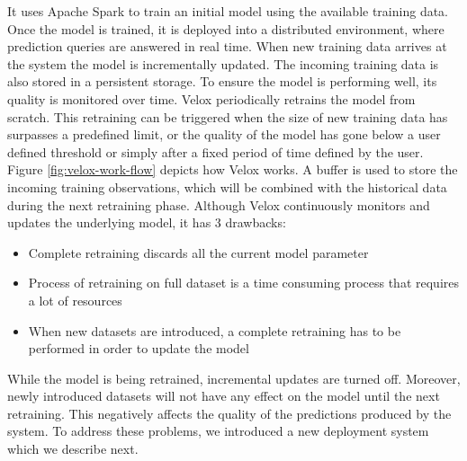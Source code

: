 \documentclass{vldb}
\begin{document}
It uses Apache Spark to train an initial model using the available training data.
Once the model is trained, it is deployed into a distributed environment, where prediction queries are answered in real time.
When new training data arrives at the system the model is incrementally updated.
The incoming training data is also stored in a persistent storage.
To ensure the model is performing well, its quality is monitored over time.
Velox periodically retrains the model from scratch. 
This retraining can be triggered when the size of new training data has surpasses a predefined limit, or the quality of the model has gone below a user defined threshold or simply after a fixed period of time defined by the user.
Figure \ref{fig:velox-work-flow} depicts how Velox works. 
A buffer is used to store the incoming training observations, which will be combined with the historical data during the next retraining phase.
Although Velox continuously monitors and updates the underlying model, it has 3 drawbacks:\\
\begin{itemize}
\item Complete retraining discards all the current model parameter
\item Process of retraining on full dataset is a time consuming process that requires a lot of resources
\item When new datasets are introduced, a complete retraining has to be performed in order to update the model
\end{itemize}
While the model is being retrained, incremental updates are turned off.
Moreover, newly introduced datasets will not have any effect on the model until the next retraining.
This negatively affects the quality of the predictions produced by the system.
To address these problems, we introduced a new deployment system which we describe next.
\end{document}
